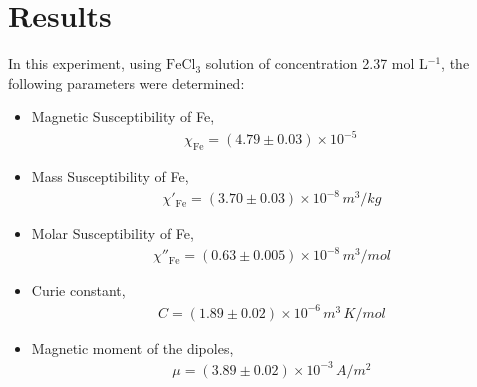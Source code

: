 \section{Results}
In this experiment, using $\text{FeCl}_3$ solution of concentration 2.37 mol L$^{-1}$, the following parameters were determined:

\begin{itemize}
    \item Magnetic Susceptibility of Fe, 
        \begin{align*}
            \chi_\text{Fe} = (4.79 \pm 0.03) \times 10^{-5}\,
        \end{align*}
    \item Mass Susceptibility of Fe, 
        \begin{align*}
            \chi'_\text{Fe} = (3.70 \pm 0.03) \times 10^{-8}\,m^3/kg 
        \end{align*}
    \item Molar Susceptibility of Fe, 
        \begin{align*}
            \chi''_\text{Fe} = (0.63 \pm 0.005) \times 10^{-8}\,m^3/mol 
        \end{align*}
    \item Curie constant, 
        \begin{align*}
            C = (1.89 \pm 0.02) \times 10^{-6}\,m^3\,K/mol
        \end{align*}
    \item Magnetic moment of the dipoles, 
        \begin{align*}
            \mu = (3.89 \pm 0.02) \times 10^{-3}\,A/m^2
        \end{align*}
\end{itemize}